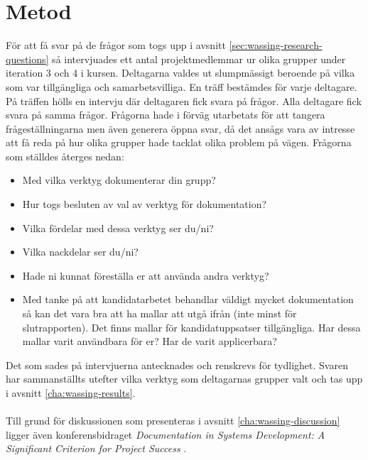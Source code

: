 
\chapter{Metod}
\label{cha:wassing-method}
För att få svar på de frågor som togs upp i avsnitt \ref{sec:wassing-research-questions} så intervjuades ett antal projektmedlemmar ur olika grupper under iteration 3 och 4 i kursen. Deltagarna valdes ut slumpmässigt beroende på vilka som var tillgängliga och samarbetsvilliga. En träff bestämdes för varje deltagare. På träffen hölls en intervju där deltagaren fick svara på frågor. Alla deltagare fick svara på samma frågor. Frågorna hade i förväg utarbetats för att tangera frågeställningarna men även generera öppna svar, då det ansågs vara av intresse att få reda på hur olika grupper hade tacklat olika problem på vägen. Frågorna som ställdes återges nedan: %
\begin{itemize}
\item{Med vilka verktyg dokumenterar din grupp?}
\item{Hur togs besluten av val av verktyg för dokumentation?}
\item{Vilka fördelar med dessa verktyg ser du/ni?}
\item{Vilka nackdelar ser du/ni?}
\item{Hade ni kunnat föreställa er att använda andra verktyg?}
\item{Med tanke på att kandidatarbetet behandlar väldigt mycket dokumentation så kan det vara bra att ha mallar att utgå ifrån (inte minst för slutrapporten). Det finns mallar för kandidatuppsatser tillgängliga. Har dessa mallar varit användbara för er? Har de varit applicerbara?}
\end{itemize}
Det som sades på intervjuerna antecknades och renskrevs för tydlighet. Svaren har sammanställts utefter vilka verktyg som deltagarnas grupper valt och tas upp i avsnitt \ref{cha:wassing-results}.
\\ \\
Till grund för diskussionen som presenteras i avsnitt \ref{cha:wassing-discussion} ligger även konferensbidraget \textit{Documentation in Systems Development: A Significant Criterion for Project
Success} \cite{docsystemdev}. %

